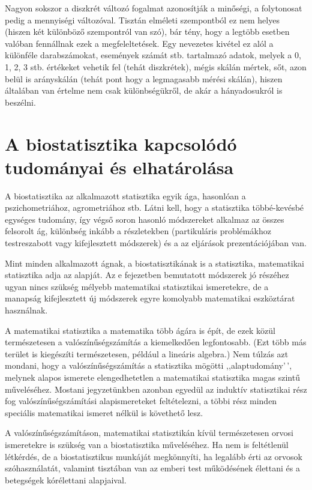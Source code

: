 \documentclass[
]{book}
\begin{document}
Nagyon sokszor a diszkrét változó fogalmat azonosítják a minőségi, a folytonosat pedig a mennyiségi változóval. Tisztán elméleti szempontból ez nem helyes (hiszen két különböző szempontról van szó), bár tény, hogy a legtöbb esetben valóban fennállnak ezek a megfeleltetések. Egy nevezetes kivétel ez alól a különféle darabszámokat, események számát stb. tartalmazó adatok, melyek a 0, 1, 2, 3 stb. értékeket vehetik fel (tehát diszkrétek), mégis skálán mértek, sőt, azon belül is arányskálán (tehát pont hogy a legmagasabb mérési skálán), hiszen általában van értelme nem csak különbségükről, de akár a hányadosukról is beszélni.

\hypertarget{alapokvelhatarolas}{%
\section{A biostatisztika kapcsolódó tudományai és elhatárolása}\label{alapokvelhatarolas}}

A biostatisztika az alkalmazott statisztika egyik ága, hasonlóan a pszichometriához, agrometriához stb. Látni kell, hogy a statisztika többé-kevésbé egységes tudomány, így végső soron hasonló módszereket alkalmaz az összes felsorolt ág, különbség inkább a részletekben (partikuláris problémákhoz testreszabott vagy kifejlesztett módszerek) és a az eljárások prezentációjában van.

Mint minden alkalmazott ágnak, a biostatisztikának is a statisztika, matematikai statisztika adja az alapját. Az e fejezetben bemutatott módszerek jó részéhez ugyan nincs szükség mélyebb matematikai statisztikai ismeretekre, de a manapság kifejlesztett új módszerek egyre komolyabb matematikai eszköztárat használnak.

A matematikai statisztika a matematika több ágára is épít, de ezek közül természetesen a valószínűségszámítás a kiemelkedően legfontosabb. (Ezt több más terület is kiegészíti természetesen, például a lineáris algebra.) Nem túlzás azt mondani, hogy a valószínűségszámítás a statisztika mögötti ,,alaptudomány'\,', melynek alapos ismerete elengedhetetlen a matematikai statisztika magas szintű műveléséhez. Mostani jegyzetünkben azonban egyedül az induktív statisztikai rész fog valószínűségszámítási alapismereteket feltételezni, a többi rész minden speciális matematikai ismeret nélkül is követhető lesz.

A valószínűségszámításon, matematikai statisztikán kívül természetesen orvosi ismeretekre is szükség van a biostatisztika műveléséhez. Ha nem is feltétlenül létkérdés, de a biostatisztikus munkáját megkönnyíti, ha legalább érti az orvosok szóhasználatát, valamint tisztában van az emberi test működésének élettani és a betegségek kórélettani alapjaival.
\end{document}
